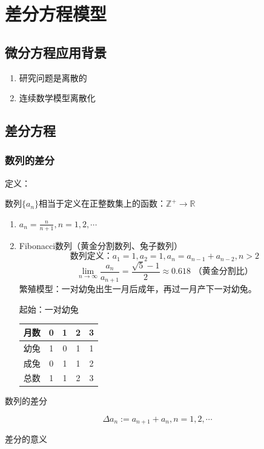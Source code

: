 \section{差分方程模型}
\subsection{微分方程应用背景}
\begin{enumerate}
\item 研究问题是离散的
\item 连续数学模型离散化
\end{enumerate}
\subsection{差分方程}
\subsubsection{数列的差分}
{\heiti 定义：}\par
数列$\{a_n\}$相当于定义在正整数集上的函数：$\mathbb{Z}^+ \rightarrow \mathbb{R}$
{\renewcommand\labelenumi{例\theenumi}
\begin{enumerate}
\item $a_n = \frac{n}{n+1}, n = 1, 2, \cdots$
\item Fibonacci数列（黄金分割数列、兔子数列）
\[
\text{数列定义：}a_1 = 1, a_2 = 1, a_n = a_{n-1}+a_{n-2}, n>2
\]\[
\lim_{n\to\infty} \frac{a_n}{a_{n+1}} = \frac{\sqrt{5}-1}{2} \approx 0.618\text{ （黄金分割比）}
\]
繁殖模型：一对幼兔出生一月后成年，再过一月产下一对幼兔。

起始：一对幼兔

\begin{tabular}{ccccc}
\hline
月数 & 0 & 1 & 2 & 3 \\
\hline
幼兔 & 1 & 0 & 1 & 1 \\
\hline
成兔 & 0 & 1 & 1 & 2 \\
\hline
总数 & 1 & 1 & 2 & 3 \\
\hline
\end{tabular}
\end{enumerate}}\par
{\heiti 数列的差分}\par
\[\Delta a_n := a_{n+1} + a_n, n = 1, 2, \cdots\]\par
{\heiti 差分的意义}
